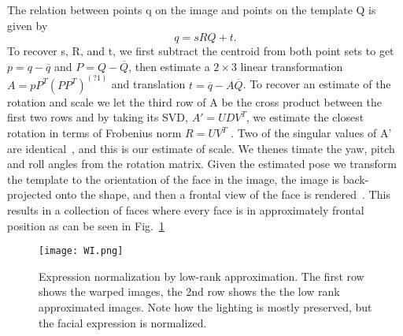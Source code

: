 \documentclass[10pt,twocolumn,letterpaper]{article}
\begin{document}
The relation between points q on the image and points on the template Q is given by
\begin{equation}
q = sRQ + t.
\end{equation}
To recover s, R, and t, we first subtract the centroid from both point sets to get $p = q-\overline{q}$ and $P = Q-\overline{Q}$, then estimate a \begin{math} 2\times3 \end{math} linear transformation \begin{math} A = pP^T (PP^T )^(?1)\end{math} and translation \begin{math}t = \overline{q}-A\overline{Q} \end{math}. To recover an estimate of the rotation and scale we let the third row of A be the cross product between the first two rows and by taking its SVD, $A' = UDV^T$, we estimate the closest rotation in terms of Frobenius norm $R = UV^T$ . Two of the singular values of A' are identical~\cite{Kemelmachershlizerman2011Face}, and this is our estimate of scale. We thenes timate the yaw, pitch and roll angles from the rotation matrix. Given the estimated pose we transform the template to the orientation of the face in the image, the image is back-projected onto the shape, and then a frontal view of the face is rendered~\cite{Lin2010Accurate}. This results in a collection of faces where every face is in approximately frontal position as can be seen in Fig.~\ref{fig:1}

\begin{figure}[!htb]
\begin{center}
\texttt{[image: WI.png]}
\end{center}
\caption{  Expression normalization by low-rank approximation. The first row shows the warped images, the 2nd row shows the the low rank approximated images. Note how the lighting is mostly preserved, but the facial expression is normalized.}
\label{fig:1}
\end{figure}
\end{document}
